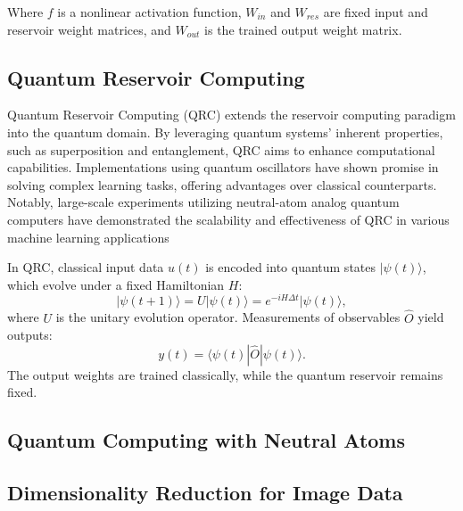 \documentclass[conference]{IEEEtran}
\begin{document}

Where \( f \) is a nonlinear activation function,
\( W_{in} \) and \( W_{res} \) are fixed input and reservoir weight matrices, 
and \( W_{out} \) is the trained output weight matrix.




\subsection{Quantum Reservoir Computing}
Quantum Reservoir Computing (QRC) extends the reservoir 
computing paradigm into the quantum domain. By leveraging quantum systems' 
inherent properties, such as superposition and entanglement, QRC aims 
to enhance computational capabilities. Implementations using quantum 
oscillators have shown promise in solving complex learning tasks, 
offering advantages over classical counterparts. Notably, large-scale 
experiments utilizing neutral-atom analog quantum computers have demonstrated 
the scalability and effectiveness of QRC in various machine learning applications 
\cite{kornjavcaLargescaleQuantumReservoir2024}

In QRC, classical input data \( u(t) \) is encoded into quantum states \( |\psi(t)\rangle \),
which evolve under a fixed Hamiltonian \( H \):
\begin{equation}
    |\psi(t+1)\rangle = U |\psi(t)\rangle = e^{-iH\Delta t} |\psi(t)\rangle,
\end{equation}
where \( U \) is the unitary evolution operator. Measurements of observables \( \hat{O} \) yield outputs:
\begin{equation}
    y(t) = \langle \psi(t) | \hat{O} | \psi(t) \rangle.
\end{equation}
The output weights are trained classically, while the quantum reservoir remains fixed.

\subsection{Quantum Computing with Neutral Atoms}



\subsection{Dimensionality Reduction for Image Data}
\end{document}
